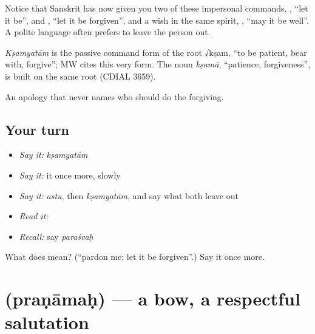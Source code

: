 Notice that Sanskrit has now given you two of these impersonal commands, , \textquotedblleft{}let it be\textquotedblright{}, and , \textquotedblleft{}let it be forgiven\textquotedblright{}, and a wish in the same spirit, , \textquotedblleft{}may it be well\textquotedblright{}. A polite language often prefers to leave the person out.

\begin{cousinweb}
\emph{Kṣamyatām} is the passive command form of the root √kṣam, \textquotedblleft{}to be patient, bear with, forgive\textquotedblright{}; MW cites this very form. The noun \emph{kṣamā}, \textquotedblleft{}patience, forgiveness\textquotedblright{}, is built on the same root (CDIAL 3659).
\end{cousinweb}

\begin{grammarlens}[title={What you've built}]
An apology that never names who should do the forgiving.
\end{grammarlens}

\subsection*{Your turn}
\begin{itemize}
\raggedright
  \item \emph{Say it:} \emph{kṣamyatām}
  \item \emph{Say it:} it once more, slowly
  \item \emph{Say it:} \emph{astu}, then \emph{kṣamyatām}, and say what both leave out
  \item \emph{Read it:} \textbf{}
  \item \emph{Recall:} say \emph{paraśvaḥ}
\end{itemize}

\begin{tcolorbox}[breakable,colback=teal!4,colframe=teal!35!black,title={Before you move on}]
What does  mean? (\textquotedblleft{}pardon me; let it be forgiven\textquotedblright{}.) Say it once more.
\end{tcolorbox}
\section[\texorpdfstring{\sk{प्रणामः} (praṇāmaḥ)}{प्रणामः (praṇāmaḥ)}]{ (praṇāmaḥ) — a bow, a respectful salutation}

\label{lesson:SA-C29-bow}



